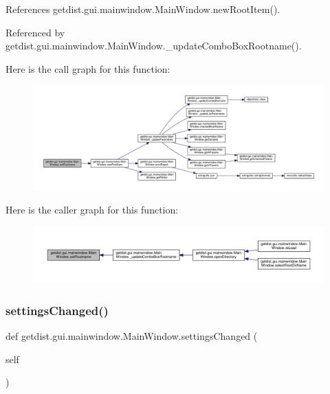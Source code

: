 References getdist.\+gui.\+mainwindow.\+Main\+Window.\+new\+Root\+Item().



Referenced by getdist.\+gui.\+mainwindow.\+Main\+Window.\+\_\+update\+Combo\+Box\+Rootname().

Here is the call graph for this function\+:
\nopagebreak
\begin{figure}[H]
\begin{center}
\leavevmode
\includegraphics[width=350pt]{classgetdist_1_1gui_1_1mainwindow_1_1MainWindow_ae2ff20b5ea04f3dbb46a6e6e447e34d7_cgraph}
\end{center}
\end{figure}
Here is the caller graph for this function\+:
\nopagebreak
\begin{figure}[H]
\begin{center}
\leavevmode
\includegraphics[width=350pt]{classgetdist_1_1gui_1_1mainwindow_1_1MainWindow_ae2ff20b5ea04f3dbb46a6e6e447e34d7_icgraph}
\end{center}
\end{figure}
\mbox{\label{classgetdist_1_1gui_1_1mainwindow_1_1MainWindow_ac0c692080d7ff6956628ce458bea4c6b}} 
\subsubsection{\texorpdfstring{settings\+Changed()}{settingsChanged()}}
{\footnotesize\ttfamily def getdist.\+gui.\+mainwindow.\+Main\+Window.\+settings\+Changed (\begin{DoxyParamCaption}\item[{}]{self }\end{DoxyParamCaption})}



